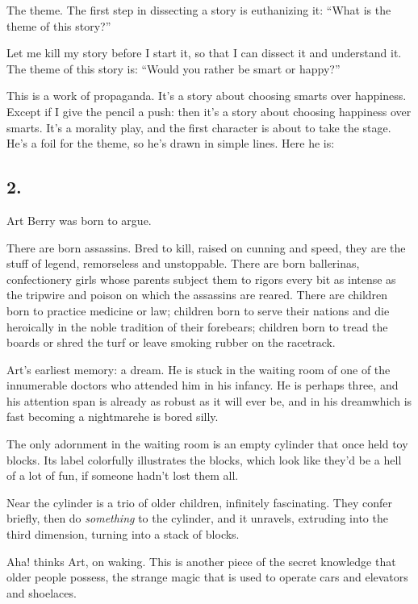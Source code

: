 The theme. The first step in dissecting a story is euthanizing it:
“What is the theme of this story?”

Let me kill my story before I start it, so that I can dissect it
and understand it. The theme of this story is: “Would you rather be
smart or happy?”

This is a work of propaganda. It’s a story about choosing smarts
over happiness. Except if I give the pencil a push: then it’s a
story about choosing happiness over smarts. It’s a morality play,
and the first character is about to take the stage. He’s a foil for
the theme, so he’s drawn in simple lines. Here he is:

\subsection{2.}

Art Berry was born to argue.

There are born assassins. Bred to kill, raised on cunning and
speed, they are the stuff of legend, remorseless and unstoppable.
There are born ballerinas, confectionery girls whose parents
subject them to rigors every bit as intense as the tripwire and
poison on which the assassins are reared. There are children born
to practice medicine or law; children born to serve their nations
and die heroically in the noble tradition of their forebears;
children born to tread the boards or shred the turf or leave
smoking rubber on the racetrack.

Art’s earliest memory: a dream. He is stuck in the waiting room of
one of the innumerable doctors who attended him in his infancy. He
is perhaps three, and his attention span is already as robust as it
will ever be, and in his dream{\dash}which is fast becoming a
nightmare{\dash}he is bored silly.

The only adornment in the waiting room is an empty cylinder that
once held toy blocks. Its label colorfully illustrates the blocks,
which look like they’d be a hell of a lot of fun, if someone hadn’t
lost them all.

Near the cylinder is a trio of older children, infinitely
fascinating. They confer briefly, then do \emph{something} to the
cylinder, and it unravels, extruding into the third dimension,
turning into a stack of blocks.

Aha! thinks Art, on waking. This is another piece of the secret
knowledge that older people possess, the strange magic that is used
to operate cars and elevators and shoelaces.

